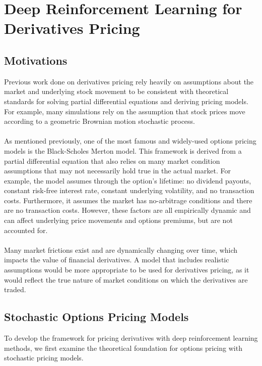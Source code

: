 \chapter{Deep Reinforcement Learning for Derivatives Pricing}

\section{Motivations}
Previous work done on derivatives pricing rely heavily on assumptions about the market and underlying stock movement to be consistent with theoretical standards for solving partial differential equations and deriving pricing models. For example, many simulations rely on the assumption that stock prices move according to a geometric Brownian motion stochastic process.
\\
\\
As mentioned previously, one of the most famous and widely-used options pricing models is the Black-Scholes Merton model. This framework is derived from a partial differential equation that also relies on many market condition assumptions that may not necessarily hold true in the actual market. For example, the model assumes through the option’s lifetime: no dividend payouts, constant risk-free interest rate, constant underlying volatility, and no transaction costs. Furthermore, it assumes the market has no-arbitrage conditions and there are no transaction costs. However, these factors are all empirically dynamic and can affect underlying price movements and options premiums, but are not accounted for.
\\
\\
Many market frictions exist and are dynamically changing over time, which impacts the value of financial derivatives. A model that includes realistic assumptions would be more appropriate to be used for derivatives pricing, as it would reflect the true nature of market conditions on which the derivatives are traded.

\section{Stochastic Options Pricing Models}
To develop the framework for pricing derivatives with deep reinforcement learning methods, we first examine the theoretical foundation for options pricing with stochastic pricing models. 

